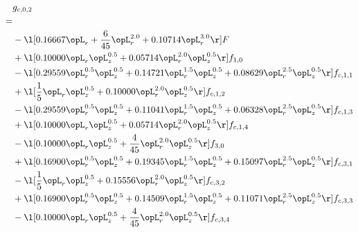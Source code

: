 \begin{alignat}{2} 
\label{eq:g_02_0} 
& g_{c,0,2} \nonumber \\ 
 = \\ 
& - \l[  0.16667 \opL_r + \frac{6}{45} \opL_r^{2.0} +  0.10714 \opL_r^{3.0}  \r] F \nonumber \\ 
& + \l[  0.10000 \opL_r \opL_z^{0.5} +  0.05714 \opL_r^{2.0} \opL_z^{0.5}  \r] f_{1,0} \nonumber \\ 
& - \l[  0.29559 \opL_r^{0.5} \opL_z^{0.5} +  0.14721 \opL_r^{1.5} \opL_z^{0.5} +  0.08629 \opL_r^{2.5} \opL_z^{0.5}  \r] f_{c,1,1} \nonumber \\ 
& + \l[ \frac{1}{5} \opL_r \opL_z^{0.5} +  0.10000 \opL_r^{2.0} \opL_z^{0.5}  \r] f_{c,1,2} \nonumber \\ 
& - \l[  0.29559 \opL_r^{0.5} \opL_z^{0.5} +  0.11041 \opL_r^{1.5} \opL_z^{0.5} +  0.06328 \opL_r^{2.5} \opL_z^{0.5}  \r] f_{c,1,3} \nonumber \\ 
& + \l[  0.10000 \opL_r \opL_z^{0.5} +  0.05714 \opL_r^{2.0} \opL_z^{0.5}  \r] f_{c,1,4} \nonumber \\ 
& - \l[  0.10000 \opL_r \opL_z^{0.5} + \frac{4}{45} \opL_r^{2.0} \opL_z^{0.5}  \r] f_{3,0} \nonumber \\ 
& + \l[  0.16900 \opL_r^{0.5} \opL_z^{0.5} +  0.19345 \opL_r^{1.5} \opL_z^{0.5} +  0.15097 \opL_r^{2.5} \opL_z^{0.5}  \r] f_{c,3,1} \nonumber \\ 
& - \l[ \frac{1}{5} \opL_r \opL_z^{0.5} +  0.15556 \opL_r^{2.0} \opL_z^{0.5}  \r] f_{c,3,2} \nonumber \\ 
& + \l[  0.16900 \opL_r^{0.5} \opL_z^{0.5} +  0.14509 \opL_r^{1.5} \opL_z^{0.5} +  0.11071 \opL_r^{2.5} \opL_z^{0.5}  \r] f_{c,3,3} \nonumber \\ 
& - \l[  0.10000 \opL_r \opL_z^{0.5} + \frac{4}{45} \opL_r^{2.0} \opL_z^{0.5}  \r] f_{c,3,4} \nonumber \\ 
\end{alignat} 


